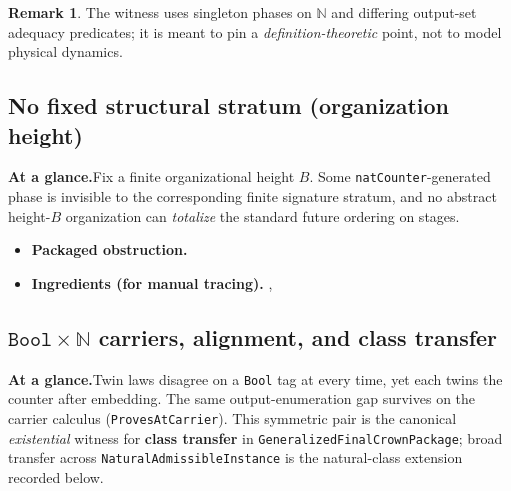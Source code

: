 \documentclass[11pt,a4paper]{article}
\newenvironment{witnessmeta}{%
  \par\smallskip
  \begin{tcolorbox}[
    enhanced, breakable=false,
    colback=gray!7, colframe=gray!55, boxrule=0.45pt, arc=2pt,
    left=8pt, right=8pt, top=5pt, bottom=5pt,
    before skip=0.25\baselineskip, after skip=0.4\baselineskip,
    fontupper=\small
  ]
}{\end{tcolorbox}}
\theoremstyle{definition}
\newtheorem{remark}[theorem]{Remark}
\begin{document}
\begin{remark}
The witness uses singleton phases on $\mathbb{N}$ and differing output-set adequacy predicates; it is meant to pin a \emph{definition-theoretic} point, not to model physical dynamics.
\end{remark}

\subsection{No fixed structural stratum (organization height)}

\begin{witnessmeta}
\textbf{At a glance.}\quad Fix a finite organizational height $B$. Some \texttt{natCounter}-generated phase is invisible to the corresponding finite signature stratum, and no abstract height-$B$ organization can \emph{totalize} the standard future ordering on stages.
\end{witnessmeta}

\begin{itemize}[leftmargin=1.6em, itemsep=0.3em]
\item \textbf{Packaged obstruction.} 
\item \textbf{Ingredients (for manual tracing).}
  ,\;
\end{itemize}

\subsection{\texorpdfstring{$\texttt{Bool}{\times}\mathbb{N}$ carriers, alignment, and class transfer}{Bool x N carriers, alignment, and class transfer}}

\begin{witnessmeta}
\textbf{At a glance.}\quad Twin laws disagree on a \texttt{Bool} tag at every time, yet each twins the counter after embedding. The same output-enumeration gap survives on the carrier calculus (\texttt{ProvesAtCarrier}). This symmetric pair is the canonical \emph{existential} witness for \textbf{class transfer} in \texttt{GeneralizedFinalCrownPackage}; broad transfer across \texttt{NaturalAdmissibleInstance} is the natural-class extension recorded below.
\end{witnessmeta}
\end{document}
